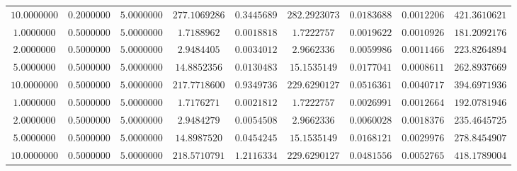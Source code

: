 \begin{tabular}{ccccccccc}
$10.0000000$ & $0.2000000$ & $5.0000000$ & $277.1069286$ & $0.3445689$ & $282.2923073$ & $0.0183688$ & $0.0012206$ & $421.3610621$\\
$1.0000000$ & $0.5000000$ & $5.0000000$ & $1.7188962$ & $0.0018818$ & $1.7222757$ & $0.0019622$ & $0.0010926$ & $181.2092176$\\
$2.0000000$ & $0.5000000$ & $5.0000000$ & $2.9484405$ & $0.0034012$ & $2.9662336$ & $0.0059986$ & $0.0011466$ & $223.8264894$\\
$5.0000000$ & $0.5000000$ & $5.0000000$ & $14.8852356$ & $0.0130483$ & $15.1535149$ & $0.0177041$ & $0.0008611$ & $262.8937669$\\
$10.0000000$ & $0.5000000$ & $5.0000000$ & $217.7718600$ & $0.9349736$ & $229.6290127$ & $0.0516361$ & $0.0040717$ & $394.6971936$\\
$1.0000000$ & $0.5000000$ & $5.0000000$ & $1.7176271$ & $0.0021812$ & $1.7222757$ & $0.0026991$ & $0.0012664$ & $192.0781946$\\
$2.0000000$ & $0.5000000$ & $5.0000000$ & $2.9484279$ & $0.0054508$ & $2.9662336$ & $0.0060028$ & $0.0018376$ & $235.4645725$\\
$5.0000000$ & $0.5000000$ & $5.0000000$ & $14.8987520$ & $0.0454245$ & $15.1535149$ & $0.0168121$ & $0.0029976$ & $278.8454907$\\
$10.0000000$ & $0.5000000$ & $5.0000000$ & $218.5710791$ & $1.2116334$ & $229.6290127$ & $0.0481556$ & $0.0052765$ & $418.1789004$\\
\end{tabular}
